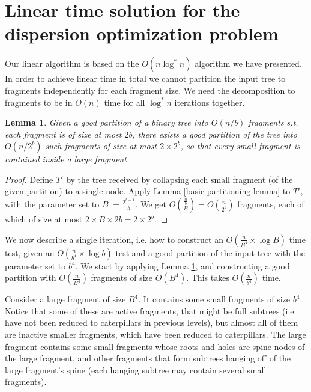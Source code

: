 \documentclass[11pt,a4paper]{article}
\newtheorem{lemma}{Lemma}
\theoremstyle{definition}
\theoremstyle{remark}
\begin{document}
\section{Linear time solution for the dispersion optimization problem}
Our linear algorithm is based on the $O(n \log ^*n)$ algorithm we have presented. In order to achieve linear time in total we cannot partition the input tree to fragments independently for each fragment size. We need the decomposition to fragments to be in $O(n)$ time for all $\log ^*n$ iterations together.
\begin{lemma}\label{good partition refinement lemma}
Given a good partition of a binary tree into $O(n/b)$ fragments s.t. each fragment is of size at most $2b$, there exists a good partition of the tree into $O(n/2^b)$ such fragments of size at most $2 \times 2^b$, so that every small fragment is contained inside a large fragment.
\end{lemma}
\begin{proof}
Define $T'$ by the tree received by collapsing each small fragment (of the given partition) to a single node. Apply Lemma \ref{basic partitioning lemma} to $T'$, with the parameter set to $B:= \frac{2^{b-1}}{b}$. We get $O(\frac{\frac{n}{b}}{B})=O(\frac{n}{2^b})$ fragments, each of which of size at most $2 \times B \times 2b = 2 \times 2^b$.
\end{proof}
We now describe a single iteration, i.e. how to construct an $O(\frac{n}{B^4} \times \log B)$ time test, given an $O(\frac{n}{b^4} \times \log b)$ test and a good partition of the input tree with the parameter set to $b^4$. We start by applying Lemma \ref{good partition refinement lemma}, and constructing a good partition with $O(\frac{n}{B^4})$ fragments of size $O(B^4)$. This takes $O(\frac{n}{b^4})$ time.

Consider a large fragment of size $B^4$. It contains some small fragments of size $b^4$. Notice that some of these are active fragments, that might be full subtrees (i.e. have not been reduced to caterpillars in previous levels), but almost all of them are inactive smaller fragments, which have been reduced to caterpillars. The large fragment contains some small fragments whose roots and holes are spine nodes of the large fragment, and other fragments that form subtrees hanging off of the large fragment's spine (each hanging subtree may contain several small fragments). 
\end{document}
